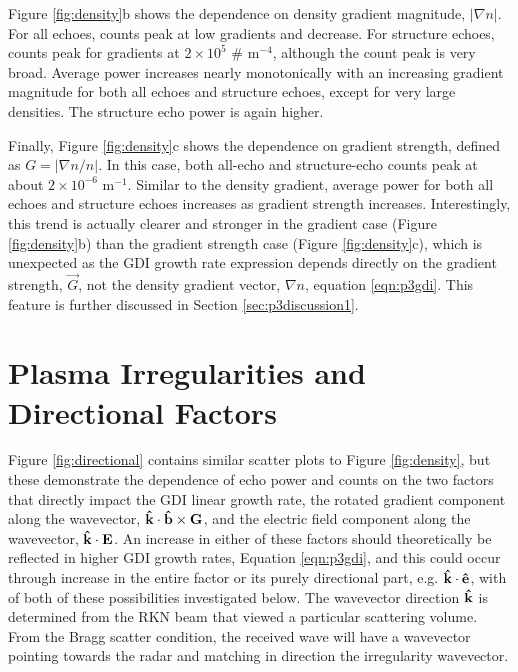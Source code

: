 Figure \ref{fig:density}b shows the dependence on density gradient magnitude, \(|\nabla n|\).  For all echoes, counts peak at low gradients and decrease.  For structure echoes, counts peak for gradients at \(2\times10^5\) \# m\(^{-4}\), although the count peak is very broad.  Average power increases nearly monotonically with an increasing gradient magnitude for both all echoes and structure echoes, except for very large densities. The structure echo power is again higher.

Finally, Figure \ref{fig:density}c shows the dependence on gradient strength, defined as \(G = |\nabla n/n|\).  In this case, both all-echo and structure-echo counts peak at about \(2\times10^{-6}\) m\(^{-1}\).  Similar to the density gradient, average power for both all echoes and structure echoes increases as gradient strength increases.  Interestingly, this trend is actually clearer and stronger in the gradient case (Figure \ref{fig:density}b) than the gradient strength case (Figure \ref{fig:density}c), which is unexpected as the GDI growth rate expression depends directly on the gradient strength, \(\vec{G}\), not the density gradient vector, \(\nabla n\), equation \ref{eqn:p3gdi}.  This feature is further discussed in Section \ref{sec:p3discussion1}.



\section{Plasma Irregularities and Directional Factors}
Figure \ref{fig:directional} contains similar scatter plots to Figure \ref{fig:density}, but these demonstrate the dependence of echo power and counts on the two factors that directly impact the GDI linear growth rate, the rotated gradient component along the wavevector, \(\mathbf{\hat{k}}\cdot\mathbf{\hat{b}}\times\mathbf{G}\), and the electric field component along the wavevector, \(\mathbf{\hat{k}}\cdot\mathbf{E}\). An increase in either of these factors should theoretically be reflected in higher GDI growth rates, Equation \ref{eqn:p3gdi}, and this could occur through increase in the entire factor or its purely directional part, e.g. \(\mathbf{\hat{k}}\cdot\mathbf{\hat{e}}\), with of both of these possibilities investigated below. The wavevector direction \(\mathbf{\hat{k}}\) is determined from the RKN beam that viewed a particular scattering volume.  From the Bragg scatter condition, the received wave will have a wavevector pointing towards the radar and matching in direction the irregularity wavevector.

